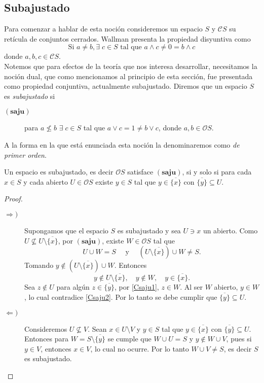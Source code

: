 \subsection{Subajustado}

Para comenzar a hablar de esta noción consideremos un espacio $S$ y $\mathcal{C}S$ su retícula de conjuntos cerrados. Wallman presenta la propiedad disyuntiva como
\[
\mbox{Si }a\neq b, \exists\; c\in S \mbox{ tal que }a\wedge c\neq 0=b\wedge c
\]
donde $a, b, c\in \mathcal{C}S$.\\

Notemos que para efectos de la teoría que nos interesa desarrollar, necesitamos la noción dual, que como mencionamos al principio de esta sección, fue presentada como propiedad conjuntiva, actualmente subajustado. Diremos que un espacio $S$ es \emph{subajustado} si

\begin{description}
    \item[$(\mathbf{saju})$] para $a\nleq b$ $\exists\; c\in S$ tal que $a\vee c=1\neq b\vee c$, donde $a,b\in \mathcal{O}S$.
\end{description}
A la forma en la que está enunciada esta noción la denominaremos como \emph{de primer orden}.

\begin{thm}\label{Saju1}
    Un espacio es subajustado, es decir $\mathcal{O}S$ satisface $(\mathbf{saju})$, si y solo si para cada $x\in S$ y cada abierto $U\in \mathcal{O}S$ existe $y\in S$ tal que $y\in \overline{\{x\}}$ con $\overline{\{y\}}\subseteq U$.
\end{thm}

\begin{proof}
    \begin{description}
        \item[$\Rightarrow )$] Supongamos que el espacio $S$ es subajustado y sea $U\ni x$ un abierto. Como $U\nsubseteq U\setminus \overline{\{x\}}$, por $(\mathbf{saju})$, existe $W\in \mathcal{O}S$ tal que 
        \begin{equation}\label{Csaju1}
            U\cup W=S \quad\mbox{ y }\quad(U\setminus\overline{\{x\}})\cup W\neq S.
        \end{equation}
        Tomando $y\notin (U\setminus\overline{\{x\}})\cup W$. Entonces 
        \begin{equation}\label{Csaju2}
            y\notin U\setminus\overline{\{x\}}, \quad y\notin W, \quad y\in \overline{\{x\}}.
        \end{equation}
        Sea $z\notin U$ para algún $z\in \overline{\{y\}}$, por \ref{Csaju1}, $z\in W$. Al ser $W$ abierto, $y\in W$, lo cual contradice \ref{Csaju2}. Por lo tanto se debe cumplir que $\overline{\{y\}}\subseteq U$.
        \item[$\Leftarrow )$] Consideremos $U\nsubseteq V$.  Sean $x\in U\setminus V$ y $y\in S$ tal que $y\in \overline{\{x\}}$ con $\overline{\{y\}}\subseteq U$. Entonces para $W=S\setminus \overline{\{y\}}$ se cumple que $W\cup U=S$ y $y\notin W\cup V$, pues si $y\in V$, entonces $x\in V$, lo cual no ocurre. Por lo tanto $W\cup V\neq S$, es decir $S$ es subajustado.
    \end{description}
\end{proof}

